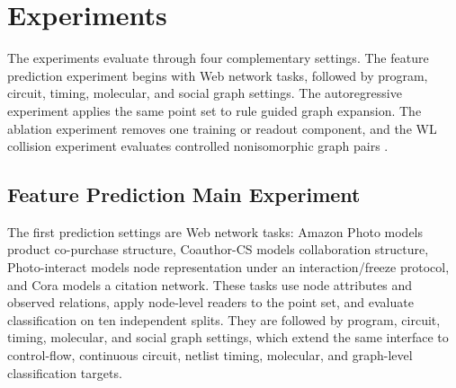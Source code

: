 \section{Experiments}
\label{sec:experiments}

The experiments evaluate \method{} through four complementary settings.  The
feature prediction experiment begins with Web network tasks, followed by
program, circuit, timing, molecular, and social graph settings.  The
autoregressive experiment applies the same point set to rule guided graph
expansion.  The ablation experiment removes one training or readout component,
and the WL collision experiment evaluates controlled nonisomorphic graph pairs
\cite{morris2019wl,wang2023brec}.

\subsection{Feature Prediction Main Experiment}
\label{sec:feature-main}

The first prediction settings are Web network tasks: Amazon Photo models
product co-purchase structure, Coauthor-CS models collaboration structure,
Photo-interact models node representation under an interaction/freeze
protocol, and Cora models a citation network.  These tasks use node attributes
and observed relations, apply node-level readers to the point set, and evaluate
classification on ten independent splits.  They are followed by program,
circuit, timing, molecular, and social graph settings, which extend the same
interface to control-flow, continuous circuit, netlist timing, molecular, and
graph-level classification targets.

